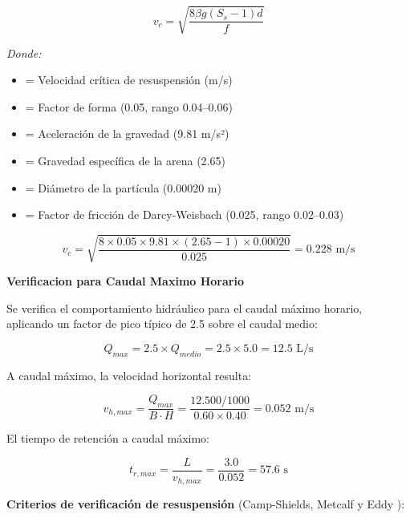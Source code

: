 \begin{equation}
v_c = \sqrt{\frac{8 \beta g (S_s - 1) d}{f}}
\end{equation}

\textit{Donde:}
\begin{itemize}[noitemsep,leftmargin=2em]
    \item[$v_c$] = Velocidad cr\'itica de resuspensi\'on (m/s)
    \item[$\beta$] = Factor de forma (0.05, rango 0.04--0.06)
    \item[$g$] = Aceleraci\'on de la gravedad (9.81 m/s²)
    \item[$S_s$] = Gravedad espec\'ifica de la arena (2.65)
    \item[$d$] = Di\'ametro de la part\'icula (0.00020 m)
    \item[$f$] = Factor de fricci\'on de Darcy-Weisbach (0.025, rango 0.02--0.03)
\end{itemize}

\begin{equation}
v_c = \sqrt{\frac{8 \times 0.05 \times 9.81 \times (2.65 - 1) \times 0.00020}{0.025}} = 0.228 \text{ m/s}
\end{equation}

\textbf{Verificacion para Caudal Maximo Horario}

Se verifica el comportamiento hidr\'aulico para el caudal m\'aximo horario, aplicando un factor de pico t\'ipico de 2.5 sobre el caudal medio:

\begin{equation}
Q_{max} = 2.5 \times Q_{medio} = 2.5 \times 5.0 = 12.5 \text{ L/s}
\end{equation}

A caudal m\'aximo, la velocidad horizontal resulta:

\begin{equation}
v_{h,max} = \frac{Q_{max}}{B \cdot H} = \frac{12.500/1000}{0.60 \times 0.40} = 0.052 \text{ m/s}
\end{equation}

El tiempo de retenci\'on a caudal m\'aximo:

\begin{equation}
t_{r,max} = \frac{L}{v_{h,max}} = \frac{3.0}{0.052} = 57.6 \text{ s}
\end{equation}

\textbf{Criterios de verificaci\'on de resuspensi\'on} (Camp-Shields, Metcalf y Eddy \cite{metcalf2014}):

